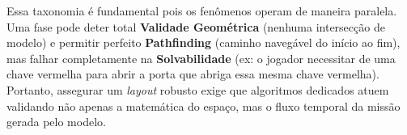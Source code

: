 Essa taxonomia é fundamental pois os fenômenos operam de maneira paralela. Uma fase pode deter total \textbf{Validade Geométrica} (nenhuma intersecção de modelo) e permitir perfeito \textbf{Pathfinding} (caminho navegável do início ao fim), mas falhar completamente na \textbf{Solvabilidade} (ex: o jogador necessitar de uma chave vermelha para abrir a porta que abriga essa mesma chave vermelha). Portanto, assegurar um \textit{layout} robusto exige que algoritmos dedicados atuem validando não apenas a matemática do espaço, mas o fluxo temporal da missão gerada pelo modelo.

